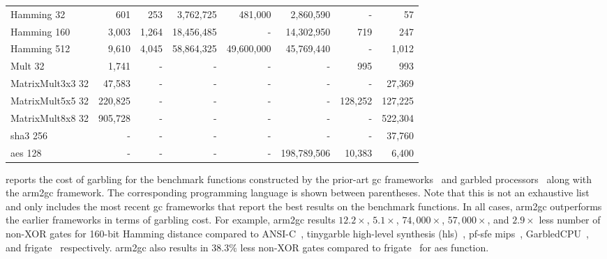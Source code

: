 \begin{table*}[t]
{\begin{tabular}{l||r|r|r|r|r|r||r}
Hamming 32 & 601 & 253 & 3,762,725 & 481,000 & 2,860,590 & - & 57 \\
Hamming 160 & 3,003 & 1,264 & 18,456,485 & - & 14,302,950 & 719 & 247 \\
Hamming 512 & 9,610 & 4,045 & 58,864,325 & 49,600,000 & 45,769,440 & - & 1,012 \\
Mult 32 & 1,741 & - & - & - & - & 995 & 993 \\
MatrixMult3x3 32 & 47,583 & - & - & - & - & - & 27,369 \\
MatrixMult5x5 32 & 220,825 & - & - & - & - & 128,252 & 127,225 \\
MatrixMult8x8 32 & 905,728 & - & - & - & - & - & 522,304 \\
\acrshort{sha}3 256 & - & - & - & - & - & - & 37,760 \\
\acrshort{aes} 128 & - & - & - & - & 198,789,506 & 10,383 & 6,400
\end{tabular}
}
\end{table*}

 reports the cost of garbling for the benchmark functions constructed by the prior-art \acrshort{gc} frameworks~\cite{holzer2012secure, songhori2015tinygarble, mood2016frigate} and garbled processors~\cite{wang2016secure, songhori2016garbledcpu} along with the \gls{arm2gc} framework.
The corresponding programming language is shown between parentheses.
Note that this is not an exhaustive list and only includes the most recent \acrshort{gc} frameworks that report the best results on the benchmark functions.
In all cases, \gls{arm2gc} outperforms the earlier frameworks in terms of garbling cost.
For example, \gls{arm2gc} results $12.2\times$,  $5.1\times$, $74,000\times$, $57,000\times$, and $2.9\times$ less number of non-XOR gates for 160-bit Hamming distance compared to ANSI-C~\cite{holzer2012secure}, \gls{tinygarble} high-level synthesis (\acrshort{hls})~\cite{songhori2015tinygarble}, \acrshort{pf-sfe} \gls{mips}~\cite{songhori2015tinygarble}, GarbledCPU~\cite{songhori2016garbledcpu}, and \gls{frigate}~\cite{mood2016frigate} respectively.
\gls{arm2gc} also results in $38.3\%$ less non-XOR gates compared to \gls{frigate}~\cite{mood2016frigate} for \acrshort{aes} function.

